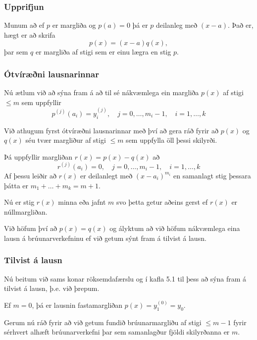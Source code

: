 \documentclass[icelandic,a4paper,12pt]{article}
\begin{document}
\subsubsection{Upprifjun}
 Munum að ef $p$ er margliða og $p(a)=0$ þá er 
 $p$ deilanleg með $(x-a)$. Það er, hægt er að skrifa
 $$
 p(x) = (x-a)q(x),
 $$
 þar sem $q$ er margliða af stigi sem er einu lægra en
 stig $p$.


\subsubsection{Ótvíræðni lausnarinnar} 
Nú ætlum við að sýna fram á að til sé nákvæmlega ein margliða 
$p(x)$ af stigi $\leq m$ sem uppfyllir 
\begin{equation*}
  p^{(j)}(a_i) = y_i^{(j)}, 
  \quad j = 0, \ldots, m_i-1, \quad i = 1, \ldots, k
\end{equation*}

\pause
Við athugum fyrst ótvíræðni lausnarinnar með því að gera ráð fyrir 
að $p(x)$ og $q(x)$ séu tvær margliður af stigi $\leq m$ sem 
uppfylla öll þessi skilyrði.

\pause
Þá uppfyllir margliðan $r(x) = p(x) - q(x)$ að
\begin{equation*}
  r^{(j)}(a_i) = 0, \quad j = 0, \ldots, m_i-1,
  \quad i = 1, \ldots,k
\end{equation*}
\pause
Af þessu leiðir að $r(x)$ er deilanlegt með $(x-a_i)^{m_i}$ en 
samanlagt stig þessara þátta er $m_1 + \ldots + m_k = m + 1$. 

\pause
Nú er stig $r(x)$ minna eða jafnt $m$ svo þetta getur aðeins gerst 
ef $r(x)$ er núllmargliðan. 

\pause
Við höfum því að $p(x) = q(x)$ og ályktum að við höfum nákvæmlega 
eina lausn á brúunarverkefninu  ef við getum 
sýnt fram á tilvist á lausn.


\subsubsection{Tilvist á lausn} 
Nú beitum við sams konar röksemdafærslu og í kafla 5.1 
til þess að sýna fram á tilvist á lausn, þ.e. við þrepum.

\pause
Ef $m = 0$, þá er lausnin fastamargliðan $p(x) = y_1^{(0)}=y_0$.

\pause
\smallskip
Gerum nú ráð fyrir 
að við getum fundið brúunarmargliðu af stigi $\leq m-1$ fyrir 
sérhvert alhæft brúunarverkefni þar 
sem samanlagður fjöldi skilyrðanna er $m$.
\end{document}
